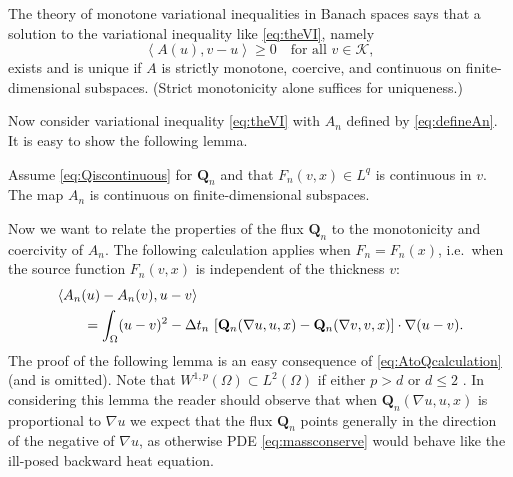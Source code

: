 \documentclass[final,onefignum]{siamart190516}
\newcommand\bQ{\mathbf{Q}}
\newcommand{\grad}{\nabla}
\newcommand{\ip}[2]{\ensuremath{\left<#1,#2\right>}}
\newcommand\RR{\mathbb{R}}
\begin{document}
The theory of monotone variational inequalities in Banach spaces \cite[chapter III]{KinderlehrerStampacchia1980} says that a solution to the variational inequality like \eqref{eq:theVI}, namely
\begin{equation}
    \ip{A(u)}{v-u} \ge 0 \quad \text{for all $v\in\mathcal{K}$}, \label{eq:VIabstract}
\end{equation}
exists and is unique if $A$ is strictly monotone, coercive, and continuous on finite-dimensional subspaces.  (Strict monotonicity alone suffices for uniqueness.)

Now consider variational inequality \eqref{eq:theVI} with $A_n$ defined by \eqref{eq:defineAn}.  It is easy to show the following lemma.

\begin{lemma}  \label{lem:continuous}  Assume \eqref{eq:Qiscontinuous} for $\bQ_n$ and that $F_n(v,x)\in L^q$ is continuous in $v$.  The map $A_n$ is continuous on finite-dimensional subspaces.
\end{lemma}


Now we want to relate the properties of the flux $\bQ_n$ to the monotonicity and coercivity of $A_n$.  The following calculation applies when $F_n=F_n(x)$, i.e.~when the source function $F_n(v,x)$ is independent of the thickness $v$:
\begin{align}
   &\ip{A_n(u) - A_n(v)}{u-v}  \label{eq:AtoQcalculation} \\
   &\qquad = \int_\Omega (u-v)^2 - \Delta t_n\, \left[\bQ_n(\grad u,u,x) - \bQ_n(\grad v,v,x)\right] \cdot \grad(u-v).  \notag
\end{align}
The proof of the following lemma is an easy consequence of \eqref{eq:AtoQcalculation} (and is omitted).  Note that $W^{1,p}(\Omega) \subset L^2(\Omega)$ if either $p>d$ or $d\le 2$ \cite[theorems 5.6.2 and 5.6.5]{Evans2010}.  In considering this lemma the reader should observe that when $\bQ_n(\grad u,u,x)$ is proportional to $\grad u$ we expect that the flux $\bQ_n$ points generally in the direction of the negative of $\grad u$, as otherwise PDE \eqref{eq:massconserve} would behave like the ill-posed backward heat equation.
\end{document}
